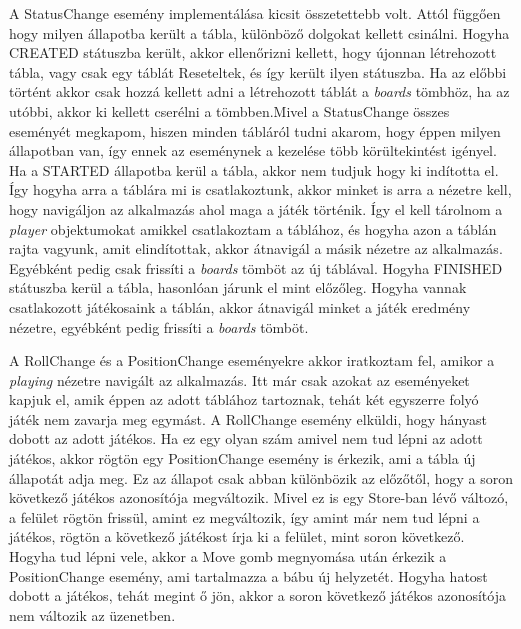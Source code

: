 \documentclass[a4paper,twoside]{article}
\begin{document}
A StatusChange esemény implementálása kicsit összetettebb volt. Attól függően hogy milyen állapotba került a tábla, különböző dolgokat kellett csinálni. Hogyha CREATED státuszba került, akkor ellenőrizni kellett, hogy újonnan létrehozott tábla, vagy csak egy táblát Reseteltek, és így került ilyen státuszba. Ha az előbbi történt akkor csak hozzá kellett adni a létrehozott táblát a \textit{boards} tömbhöz, ha az utóbbi, akkor ki kellett cserélni a tömbben.Mivel a StatusChange összes eseményét megkapom, hiszen minden tábláról tudni akarom, hogy éppen milyen állapotban van, így ennek az eseménynek a kezelése több körültekintést igényel. Ha a STARTED állapotba kerül a tábla, akkor nem tudjuk hogy ki indította el. Így hogyha arra a táblára mi is csatlakoztunk, akkor minket is arra a nézetre kell, hogy navigáljon az alkalmazás ahol maga a játék történik. Így el kell tárolnom a \textit{player} objektumokat amikkel csatlakoztam a táblához, és hogyha azon a táblán rajta vagyunk, amit elindítottak, akkor átnavigál a másik nézetre az alkalmazás. Egyébként pedig csak frissíti a \textit{boards} tömböt az új táblával. Hogyha FINISHED státuszba kerül a tábla, hasonlóan járunk el mint előzőleg. Hogyha vannak csatlakozott játékosaink a táblán, akkor átnavigál minket a játék eredmény nézetre, egyébként pedig frissíti a \textit{boards} tömböt. 

A RollChange és a PositionChange eseményekre akkor iratkoztam fel, amikor a \textit{playing} nézetre navigált az alkalmazás. Itt már csak azokat az eseményeket kapjuk el, amik éppen az adott táblához tartoznak, tehát két egyszerre folyó játék nem zavarja meg egymást. A RollChange esemény elküldi, hogy hányast dobott az adott játékos. Ha ez egy olyan szám amivel nem tud lépni az adott játékos, akkor rögtön egy PositionChange esemény is érkezik, ami a tábla új állapotát adja meg. Ez az állapot csak abban különbözik az előzőtől, hogy a soron következő játékos azonosítója megváltozik. Mivel ez is egy Store-ban lévő változó, a felület rögtön frissül, amint ez megváltozik, így amint már nem tud lépni a játékos, rögtön a következő játékost írja ki a felület, mint soron következő. Hogyha tud lépni vele, akkor a Move gomb megnyomása után érkezik a PositionChange esemény, ami tartalmazza a bábu új helyzetét. Hogyha hatost dobott a játékos, tehát megint ő jön, akkor a soron következő játékos azonosítója nem változik az üzenetben.  
\end{document}
